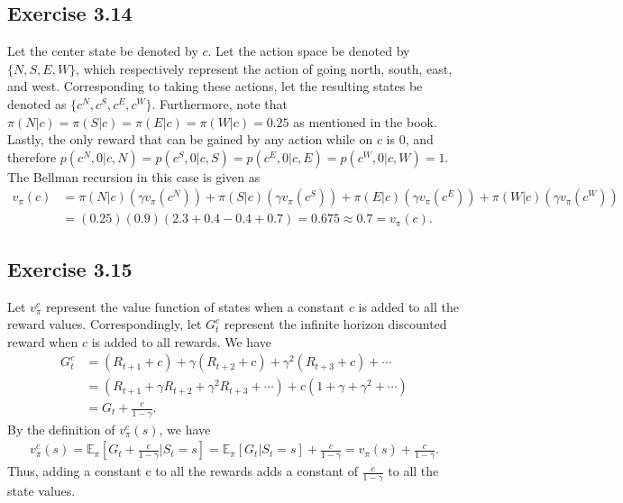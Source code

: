 \documentclass[10pt]{article}
\begin{document}
	\subsection*{Exercise 3.14}
	\label{ss:3.14}
	Let the center state be denoted by $c$. Let the action space be denoted by $\{ N,S,E,W \}$, which respectively represent the action of going north, south, east, and west. Corresponding to taking these actions, let the resulting states be denoted as $\{ c^N,c^S,c^E,c^W \}$. Furthermore, note that $\pi(N|c)=\pi(S|c)=\pi(E|c)=\pi(W|c)=0.25$ as mentioned in the book. Lastly, the only reward that can be gained by any action while on $c$ is 0, and therefore $p(c^N,0|c,N)=p(c^S,0|c,S)=p(c^E,0|c,E)=p(c^W,0|c,W)=1$. The Bellman recursion in this case is given as
	\begin{align*}
	v_{\pi}(c) &= \pi(N|c)\left( \gamma v_{\pi} (c^N) \right) + \pi(S|c)\left( \gamma v_{\pi} (c^S) \right) + \pi(E|c)\left( \gamma v_{\pi} (c^E) \right) + \pi(W|c)\left( \gamma v_{\pi} (c^W) \right)\\
	&= (0.25)(0.9)\left( 2.3 + 0.4 -0.4 + 0.7 \right) =0.675 \approx 0.7 = v_{\pi}(c).
	\end{align*}
	\subsection*{Exercise 3.15}
	\label{ss:3.15}
	Let $v_{\pi}^c$ represent the value function of states when a constant $c$ is added to all the reward values. Correspondingly, let $G_t^c$ represent the infinite horizon discounted reward when $c$ is added to all rewards.
	We have
	\begin{align*}
	G_t^c &= (R_{t+1}+c) + \gamma(R_{t+2}+c) + \gamma^2(R_{t+3}+c)+\cdots\\
	&= \left( R_{t+1} + \gamma R_{t+2} + \gamma^2 R_{t+3} + \cdots \right) + c \left( 1 + \gamma + \gamma^2 + \cdots \right)\\
	&= G_t + \frac{c}{1-\gamma}.
	\end{align*}
	By the definition of $v_{\pi}^c(s)$, we have
	\begin{align*}
	v_{\pi}^c(s) = \mathbb{E}_{\pi} \left[ G_t + \frac{c}{1-\gamma} \big| S_t = s \right] = \mathbb{E}_{\pi} \left[ G_t | S_t = s \right] + \frac{c}{1-\gamma} = v_{\pi}(s) + \frac{c}{1-\gamma}.
	\end{align*}
	Thus, adding a constant c to all the rewards adds a constant of $\frac{c}{1-\gamma}$ to all the state values.
\end{document}
